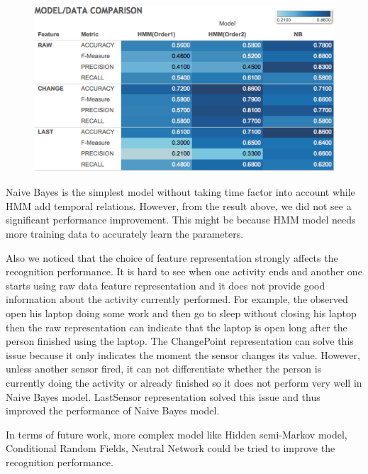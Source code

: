 \documentclass[10pt,letter]{article}
\numberwithin{equation}{section} %
\numberwithin{figure}{section} %
\numberwithin{table}{section} %
\begin{document}
\begin{figure}[h]
\centering
\includegraphics[width=15cm]{../plot/result}
\end{figure}

Naive Bayes is the simplest model without taking time factor into account while HMM add temporal relations. However, from the result above, we did not see a significant performance improvement. This might be because HMM model needs more training data to accurately learn the parameters. 

Also we noticed that the choice of feature representation strongly affects the recognition performance. It is hard to see when one activity ends and another one starts using raw data feature representation and it does not provide good information about the activity currently performed. For example, the observed open his laptop doing some work and then go to sleep without closing his laptop then the raw representation can indicate that the laptop is open long after the person finished using the laptop. The ChangePoint representation can solve this issue because it only indicates the moment the sensor changes its value. However, unless another sensor fired, it can not differentiate whether the person is currently doing the activity or already finished so it does not perform very well in Naive Bayes model. LastSensor representation solved this issue and thus improved the performance of Naive Bayes model.

In terms of future work, more complex model like Hidden semi-Markov model, Conditional Random Fields, Neutral Network could be tried to improve the recognition performance. 
\end{document}
